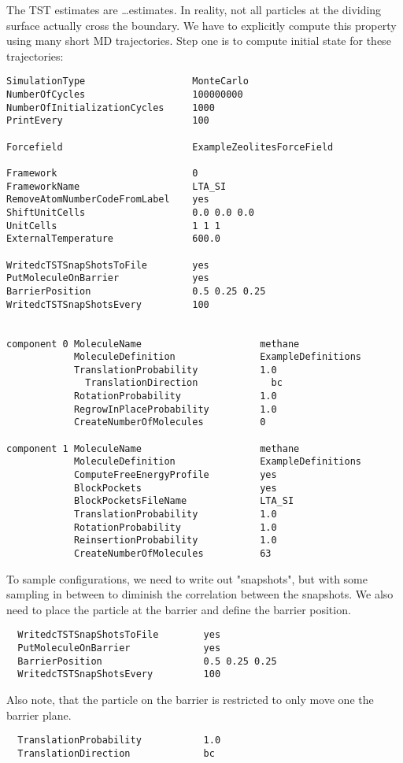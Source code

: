 The TST estimates are \dots estimates. In reality, not all particles at the dividing surface actually cross
the boundary. We have to explicitly compute this property using many short MD trajectories.
Step one is to compute initial state for these trajectories:
\begin{tiny}
\begin{verbatim}
SimulationType                   MonteCarlo
NumberOfCycles                   100000000
NumberOfInitializationCycles     1000
PrintEvery                       100

Forcefield                       ExampleZeolitesForceField

Framework                        0
FrameworkName                    LTA_SI
RemoveAtomNumberCodeFromLabel    yes
ShiftUnitCells                   0.0 0.0 0.0
UnitCells                        1 1 1
ExternalTemperature              600.0

WritedcTSTSnapShotsToFile        yes
PutMoleculeOnBarrier             yes
BarrierPosition                  0.5 0.25 0.25
WritedcTSTSnapShotsEvery         100


component 0 MoleculeName                     methane
            MoleculeDefinition               ExampleDefinitions
            TranslationProbability           1.0
              TranslationDirection             bc
            RotationProbability              1.0
            RegrowInPlaceProbability         1.0
            CreateNumberOfMolecules          0

component 1 MoleculeName                     methane
            MoleculeDefinition               ExampleDefinitions
            ComputeFreeEnergyProfile         yes
            BlockPockets                     yes
            BlockPocketsFileName             LTA_SI
            TranslationProbability           1.0
            RotationProbability              1.0
            ReinsertionProbability           1.0
            CreateNumberOfMolecules          63
\end{verbatim}
\end{tiny}

To sample configurations, we need to write out "snapshots", but with some sampling in between to diminish the
correlation between the snapshots. We also need to place the particle at the barrier and define the barrier position.

\begin{small}
\begin{verbatim}
  WritedcTSTSnapShotsToFile        yes
  PutMoleculeOnBarrier             yes
  BarrierPosition                  0.5 0.25 0.25
  WritedcTSTSnapShotsEvery         100
\end{verbatim}
\end{small}
Also note, that the particle on the barrier is restricted to only move one the barrier plane.
\begin{small}
\begin{verbatim}
  TranslationProbability           1.0
  TranslationDirection             bc
\end{verbatim}
\end{small}

